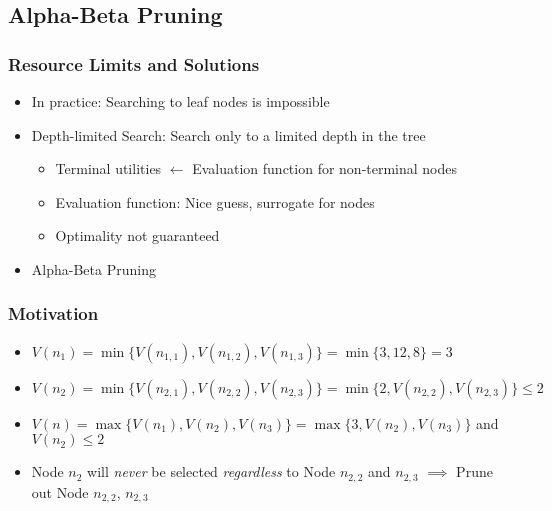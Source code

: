 \subsection{Alpha-Beta Pruning}

\subsubsection*{Resource Limits and Solutions}
\begin{itemize}
    \item In practice: Searching to leaf nodes is impossible
    \item Depth-limited Search: Search only to a limited depth in the tree
    \begin{itemize}
        \item Terminal utilities $\leftarrow$ Evaluation function for non-terminal nodes
        \item Evaluation function: Nice guess, surrogate for nodes
        \item Optimality not guaranteed
    \end{itemize}
    \item Alpha-Beta Pruning
\end{itemize}

\subsubsection*{Motivation}
\begin{itemize}
    \item $V(n_1)=\min\{V(n_{1,1}),V(n_{1,2}),V(n_{1,3})\}=\min\{3,12,8\}=3$
    \item $V(n_2)=\min\{V(n_{2,1}),V(n_{2,2}),V(n_{2,3})\}=\min\{2,V(n_{2,2}),V(n_{2,3})\}\leq2$
    \item $V(n)=\max\{V(n_1),V(n_2),V(n_3)\}=\max\{3,V(n_2),V(n_3)\}$ and $V(n_2)\leq2$
    \item Node $n_2$ will \textit{never} be selected \textit{regardless} to Node $n_{2,2}$ and $n_{2,3}$ $\implies$ Prune out Node $n_{2,2}$, $n_{2,3}$
\end{itemize}
\begin{figures}
\end{figures}

